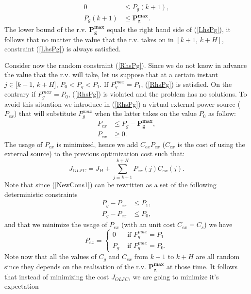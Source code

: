 \documentclass[conference]{IEEEtran}
\begin{document}
\begin{subequations}
    \begin{align}
        0 &\leq P_g(k+1) \label{LhsPg}, \\
        P_g(k+1) &\leq \bm{P_g^{max}}. \label{RhsPg}
    \end{align}
\end{subequations}
The lower bound of the r.v. $\bm{P_g^{max}}$ equals the right hand side of (\ref{LhsPg}), it follows that no matter the value that the r.v. takes on in $[k+1,\, k+H]$, constraint  (\ref{LhsPg}) is always satisfied. 

Consider now the random constraint (\ref{RhsPg}). Since we do not know in advance the value that the r.v. will take,  let us suppose that at a certain instant $ j \in [k+1, \, k+H$], $P_0 < P_g < P_1$. If $P_g^{max} = P_1$, (\ref{RhsPg}) is satisfied. On the contrary if $P_g^{max} = P_0$, (\ref{RhsPg}) is violated and the problem has no solutions. To avoid this situation we introduce in (\ref{RhsPg}) a virtual external power source ($P_{ex}$) that will substitute $P_g^{max}$ when the latter takes on the value $P_0$ as follow: 
\begin{align}
     P_{ex} & \leq P_g - \bm{P_g^{max}}, \label{NewCons1}\\
     P_{ex} & \geq \label{NewCons2}0.
\end{align}
The usage of $P_{ex}$ is minimized, hence we add $C_{ex}P_{ex}$ ($C_{ex}$ is the cost of using the external source) to the previous optimization cost such that: 
\begin{equation}
    J_{OLFC} = J_H + \sum_{j=k+1}^{k+H} P_{ex}(j)C_{ex}(j).
\end{equation}
Note that since (\ref{NewCons1}) can be rewritten as a set of the following deterministic constraints 
 \begin{align}
 P_g - P_{ex} &\leq P_1 ,\\
 P_g - P_{ex} & \leq P_0,\label{NewCons3}
 \end{align}
 and that we minimize the usage of $P_{ex}$ (with an unit cost $C_{ex} = C_s$) we have 
 \begin{equation}
    P_{ex} = \left \{
        \begin{aligned}
            0 & \text{ if }  P_g^{max} = P_1 \\
            P_g &\text{ if } P_g^{max} = P_0.
        \end{aligned}\right.
\end{equation}
 Note  now that all the values of $C_g$ and $C_{ex}$ from $k+1$ to $k+H$ are all random since they depends on the realisation of the r.v. $\bm{P_{g}^{max}}$ at those time. It follows that instead of minimizing the cost $J_{OLFC}$, we are going to minimize it's expectation
\end{document}
